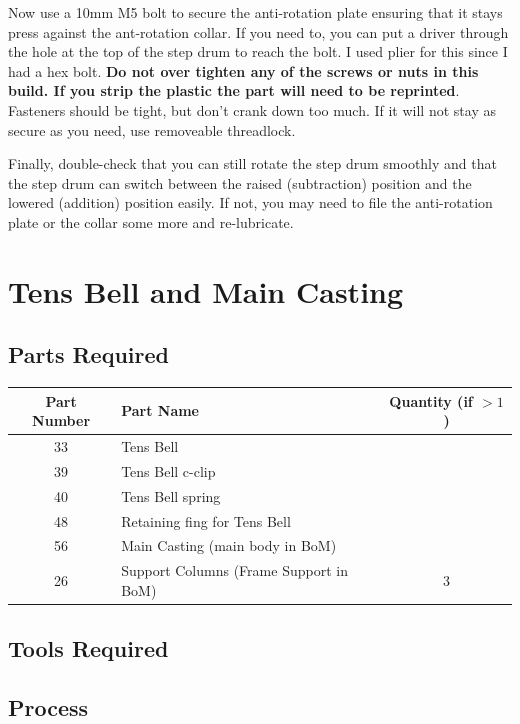 \documentclass{article}
\begin{document}
Now use a 10mm M5 bolt to secure the anti-rotation plate ensuring that it stays press against the
ant-rotation collar. If you need to, you can put a driver through the hole at the top of the step
drum to reach the bolt. I used plier for this since I had a hex bolt. \textbf{Do not over tighten
any of the screws or nuts in this build. If you strip the plastic the part will need to be reprinted}.
Fasteners should be tight, but don't crank down too much. If it will not stay as secure as you need,
use removeable threadlock.

Finally, double-check that you can still rotate the step drum smoothly and that the step drum can
switch between the raised (subtraction) position and the lowered (addition) position easily. If not,
you may need to file the anti-rotation plate or the collar some more and re-lubricate.



\newpage

\section{Tens Bell and Main Casting}

\subsection{Parts Required}
\begin{table}[h!]
	\centering
	\begin{tabular}{clc}
		Part Number & Part Name & Quantity (if $>1$) \\ \hline
		33 & Tens Bell & \\
		39 & Tens Bell c-clip & \\
		40 & Tens Bell spring & \\
		48 & Retaining fing for Tens Bell & \\
		56 & Main Casting (main body in BoM) & \\
		26 & Support Columns (Frame Support in BoM) & 3 
	\end{tabular}
\end{table}


\subsection{Tools Required}

\subsection{Process}
\end{document}
